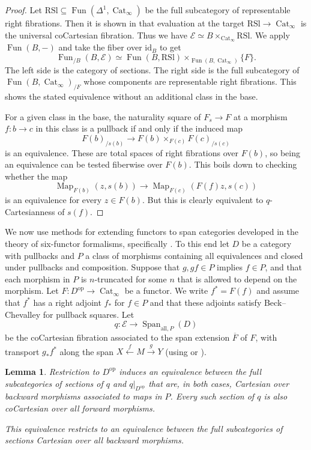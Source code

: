 \documentclass[11pt,a4paper]{article}
\newtheorem{lemma}[thm]{Lemma}
\theoremstyle{definition}
\newcommand{\op}{\mathrm{op}}
\newcommand{\Map}{\operatorname{Map}}
\newcommand{\Fun}{\operatorname{Fun}}
\newcommand{\Span}{\operatorname{Span}}
\newcommand{\id}{\mathrm{id}}
\begin{document}
\begin{proof}
Let $\mathrm{RSl}\subseteq\Fun(\Delta^1,\operatorname{Cat}_\infty)$
be the full subcategory of representable right fibrations.
Then it is shown in \cite[Corollaries~6.4--6.5]{CH} that evaluation at the target
$\mathrm{RSl}\to\operatorname{Cat}_\infty$ is the universal
coCartesian fibration. Thus we have 
$\mathcal E\simeq B\times_{\operatorname{Cat}_\infty}\mathrm{RSl}$.
We apply $\Fun(B,-)$ and take the
fiber over $\id_B$ to get
\[
 \Fun_{/B}(B,\mathcal E)\simeq
 \Fun(B,\mathrm{RSl})
 \times_{\Fun(B,\operatorname{Cat}_\infty)}\{F\}.
\]
The left side is the category of sections. The right 
side is the full subcategory of
$\Fun(B,\operatorname{Cat}_\infty)_{/F}$ whose components are
representable right fibrations. This shows the stated equivalence without an additional class in the base.

For a given class in the base, the naturality square of $F_s\to F$ at a morphism $f: b \to c$ in this class is a pullback if and only if the induced map
\[
 F(b)_{/s(b)}\longrightarrow
 F(b)\times_{F(c)}F(c)_{/s(c)}
\]
is an equivalence. These are total spaces of right fibrations over $F(b)$, so being an equivalence
can be tested  fiberwise over $F(b)$. This boils down to checking whether the map
\[
 \Map_{F(b)}(z,s(b))\longrightarrow
 \Map_{F(c)}(F(f)z,s(c))
\]
is an equivalence for every $z\in F(b)$. But this is clearly equivalent to $q$-Cartesianness of $s(f)$.\end{proof}

We now use methods for extending functors to span categories
developed in the theory of six-functor formalisms, specifically
\cite[Theorem~3.3]{DK}.
To this end let $D$ be a category with pullbacks and $P$ a class of morphisms
containing all equivalences and closed under pullbacks and composition.
Suppose that $g,gf\in P$ implies $f\in P$, and that each morphism
in $P$ is $n$-truncated for some $n$ that is allowed to depend on the morphism.
Let $F:D^{\op}\to\operatorname{Cat}_\infty$ be a functor. We write
$f^*=F(f)$ and assume that $f^*$ has a right adjoint $f_*$ for $f\in P$
and that these adjoints satisfy Beck--Chevalley for pullback squares.
Let
\[
 q:\mathcal E\longrightarrow\Span_{\mathrm{all},P}(D)
\]
be the coCartesian fibration associated to the span extension $\overline{F}$ of $F$,
with transport $g_*f^*$ along the span $X\xleftarrow{f}M\xrightarrow{g}Y$ (using \cite[Section~11]{Barwick} or \cite[Corollary~2.6(3)]{CLR}).

\begin{lemma}\label{lem:sections-span-extension}
Restriction to $D^{\op}$ induces an equivalence between the full
subcategories of sections of $q$ and $q|_{D^{\op}}$ that are,
in both cases, Cartesian over backward morphisms associated
to maps in $P$.
Every such section of $q$ is also coCartesian over all forward
morphisms.

This equivalence restricts to an equivalence between the full
subcategories of sections Cartesian over all backward morphisms.
\end{lemma}
\end{document}
